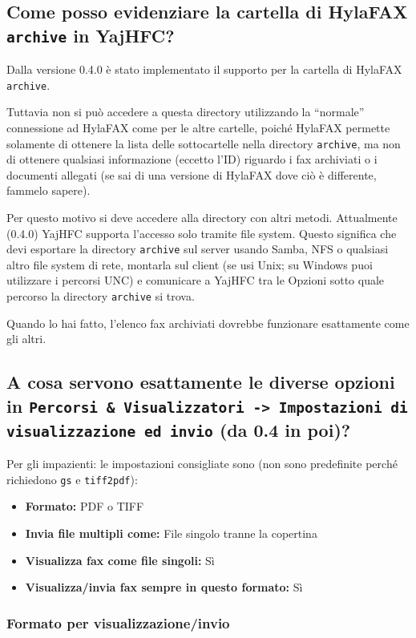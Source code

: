 \documentclass[a4paper,10pt]{scrartcl}
\begin{document}
\subsection{Come posso evidenziare la cartella di HylaFAX \texttt{archive} in YajHFC?}

Dalla versione 0.4.0 è stato implementato il supporto per la cartella di HylaFAX \texttt{archive}.

Tuttavia non si può accedere a questa directory utilizzando la ``normale'' connessione ad HylaFAX come per le altre cartelle, poiché HylaFAX permette solamente di ottenere la lista delle sottocartelle nella directory \texttt{archive}, ma non di ottenere qualsiasi informazione (eccetto l'ID) riguardo i fax archiviati o i documenti allegati (se sai di una versione di HylaFAX dove ciò è differente, fammelo sapere).

Per questo motivo si deve accedere alla directory con altri metodi. Attualmente (0.4.0) YajHFC supporta l'accesso solo tramite file system. Questo significa che devi esportare la directory  \texttt{archive} sul server usando Samba, NFS o qualsiasi altro file system di rete, montarla sul client (se usi Unix; su Windows puoi utilizzare i percorsi UNC) e comunicare a YajHFC tra le Opzioni sotto quale percorso la directory \texttt{archive} si trova.

Quando lo hai fatto, l'elenco fax archiviati dovrebbe funzionare esattamente come gli altri.

\subsection{A cosa servono esattamente le diverse opzioni in \texttt{Percorsi \& Visualizzatori -> Impostazioni di visualizzazione ed invio} (da 0.4 in poi)?}

Per gli impazienti: le impostazioni consigliate sono (non sono predefinite perché richiedono \texttt{gs} e \texttt{tiff2pdf}):
\begin{itemize}
 \item \textbf{Formato:} PDF o TIFF
 \item \textbf{Invia file multipli come:} File singolo tranne la copertina
 \item \textbf{Visualizza fax come file singoli:} Sì
 \item \textbf{Visualizza/invia fax sempre in questo formato:} Sì
\end{itemize}

\subsubsection{Formato per visualizzazione/invio}
\end{document}
